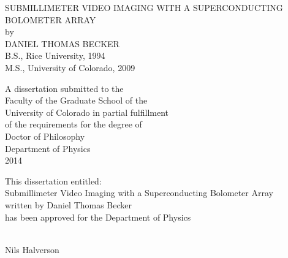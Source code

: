 \documentclass[12pt,letterpaper,openany]{memoir}
\numberwithin{equation}{chapter}
\numberwithin{figure}{chapter}
\numberwithin{table}{chapter}
\begin{document}
\frontmatter


\newcommand{\thesistitle}{Submillimeter Video Imaging with a Superconducting Bolometer Array}

\thispagestyle{empty}
\vspace*{\fill}
\begin{center}
  \parbox{6.0in}{
    \begin{center}
      \DoubleSpacing
      \MakeUppercase{\thesistitle} \\
      by \\
      DANIEL THOMAS BECKER \\
      B.S., Rice University, 1994 \\
      M.S., University of Colorado, 2009
    \end{center}
  }
\end{center}
\vspace*{1in}
\begin{center}
  \DoubleSpacing
  A dissertation submitted to the\\
  Faculty of the Graduate School of the\\
  University of Colorado in partial fulfillment\\
  of the requirements for the degree of\\
  Doctor of Philosophy \\
  Department of Physics \\
  2014
\end{center}
\vspace*{\fill}
\newpage


\thispagestyle{empty}
\vspace*{\fill}
\begin{center}
  \SingleSpacing
  This dissertation entitled:\\
  \thesistitle{} \\
  written by Daniel Thomas Becker \\
  has been approved for the Department of Physics \\
\end{center}

\vspace*{2mm}

\begin{center}
  \normalsize
  \vspace*{16mm}
  \vrule width 80mm height 0.2mm\\
  Nils Halverson
\end{center}
\end{document}
